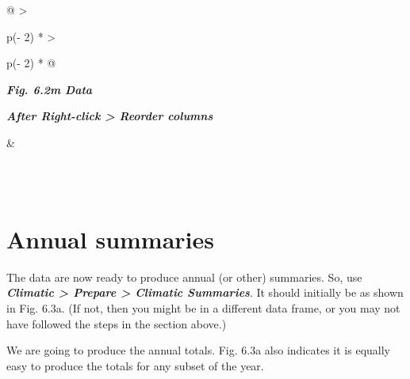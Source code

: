 \documentclass[
  letterpaper,
  DIV=11,
  numbers=noendperiod]{scrreprt}
\begin{document}
\begin{longtable}[]{@{}
  >{\raggedright\arraybackslash}p{(\columnwidth - 2\tabcolsep) * }
  >{\raggedright\arraybackslash}p{(\columnwidth - 2\tabcolsep) * }@{}}
\toprule\noalign{}
\begin{minipage}[b]{\linewidth}\raggedright
\textbf{\emph{Fig. 6.2m Data}}

\textbf{\emph{After Right-click \textgreater{} Reorder columns}}
\end{minipage} & \begin{minipage}[b]{\linewidth}\raggedright
\end{minipage} \\
\midrule\noalign{}
\endhead
\bottomrule\noalign{}
\endlastfoot
{} \\
\end{longtable}

\section{Annual summaries}\label{annual-summaries}

The data are now ready to produce annual (or other) summaries. So, use
\textbf{\emph{Climatic \textgreater{} Prepare \textgreater{} Climatic
Summaries}}. It should initially be as shown in Fig. 6.3a. (If not, then
you might be in a different data frame, or you may not have followed the
steps in the section above.)

We are going to produce the annual totals. Fig. 6.3a also indicates it
is equally easy to produce the totals for any subset of the year.
\end{document}
